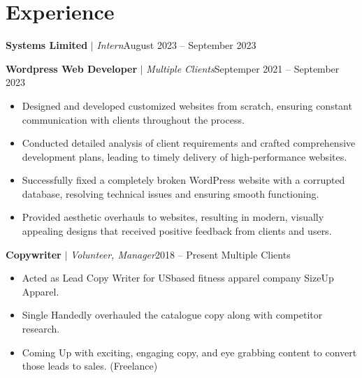 \section{Experience}
  \resumeSubHeadingListStart

          \resumeProjectHeading
          {\textbf{Systems Limited} $|$ \footnotesize\emph{Intern}\vspace{8pt}}{August 2023 -- September 2023}
          
          \resumeProjectHeading
          {\textbf{Wordpress Web Developer}\vspace{8pt} $|$ \footnotesize\emph{Multiple Clients}}{Septemper 2021 -- September 2023}
            \begin{itemize}
              \item 
              Designed and developed customized websites from scratch, ensuring constant communication with clients throughout the process.
              \item 
              Conducted detailed analysis of client requirements and crafted comprehensive development plans, leading to timely delivery of high-performance websites.
              \item 
              Successfully fixed a completely broken WordPress website with a corrupted database, resolving technical issues and ensuring smooth functioning.
              \item 
              Provided aesthetic overhauls to websites, resulting in modern, visually appealing designs that received positive feedback from clients and users.
          \end{itemize}

          \resumeProjectHeading
          {\textbf{Copywriter} $|$ \footnotesize\emph{Volunteer, Manager}\vspace{8pt}}{2018 -- Present}
          {\small{Multiple Clients}}
          \begin{itemize}
              \item
              Acted as Lead Copy Writer for USbased fitness apparel company SizeUp Apparel.
              \item 
              Single Handedly overhauled the catalogue copy along with competitor research.
              \item
               Coming Up with exciting, engaging copy, and eye grabbing content to convert those leads to sales. (Freelance)
              
              
          \end{itemize}

    \resumeSubHeadingListEnd 